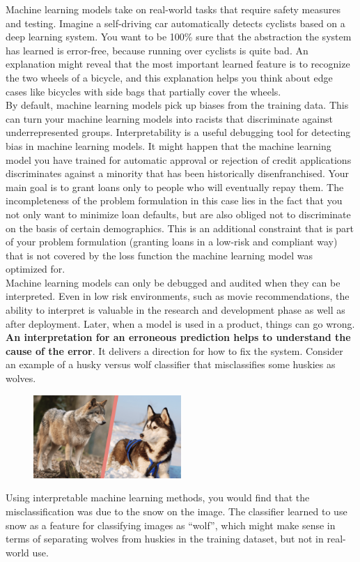 Machine learning models take on real-world tasks that require safety measures and testing. 
Imagine a self-driving car automatically detects cyclists based on a deep learning system. 
You want to be 100\% sure that the abstraction the system has learned is error-free, because 
running over cyclists is quite bad. An explanation might reveal that the most important 
learned feature is to recognize the two wheels of a bicycle, and this explanation helps 
you think about edge cases like bicycles with side bags that partially cover the wheels.\\

By default, machine learning models pick up biases from the training data. 
This can turn your machine learning models into racists that discriminate against 
underrepresented groups. Interpretability is a useful debugging tool for detecting 
bias in machine learning models. It might happen that the machine learning model you have 
trained for automatic approval or rejection of credit applications discriminates against a 
minority that has been historically disenfranchised. 
Your main goal is to grant loans only to people who will eventually repay them. 
The incompleteness of the problem formulation in this case lies in the fact that 
you not only want to minimize loan defaults, but are also obliged not to discriminate 
on the basis of certain demographics. This is an additional constraint that is part of 
your problem formulation (granting loans in a low-risk and compliant way) that is not 
covered by the loss function the machine learning model was optimized for.\\

Machine learning models can only be debugged and audited when they can be interpreted. 
Even in low risk environments, such as movie recommendations, the ability to interpret 
is valuable in the research and development phase as well as after deployment.
Later, when a model is used in a product, things can go wrong. \textbf{An interpretation 
for an erroneous prediction helps to understand the cause of the error}.
It delivers a direction for how to fix the system. Consider an example of a 
husky versus wolf classifier that misclassifies some huskies as wolves.

\begin{figure}[H]
    \includegraphics[width=0.5\textwidth]{img/wolf_vs_husky.png}
    \centering
\end{figure}

Using interpretable machine learning methods, you would find that the 
misclassification was due to the snow on the image. 
The classifier learned to use snow as a feature for classifying images as “wolf”, 
which might make sense in terms of separating wolves from huskies in the training 
dataset, but not in real-world use.

